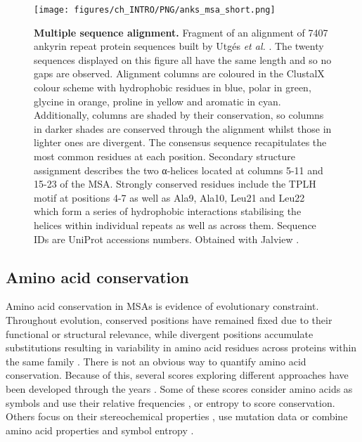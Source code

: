 \begin{figure}[htb!]
    \centering
    \texttt{[image: figures/ch\_INTRO/PNG/anks\_msa\_short.png]}
    \caption[Multiple sequence alignment]{\textbf{Multiple sequence alignment.} Fragment of an alignment of 7407 ankyrin repeat protein sequences built by Utgés \textit{et al.} \cite{UTGES_2021_ANKS}. The twenty sequences displayed on this figure all have the same length and so no gaps are observed. Alignment columns are coloured in the ClustalX colour scheme \cite{JEANMOUGIN_1998_CLUSTALX} with hydrophobic residues in blue, polar in green, glycine in orange, proline in yellow and aromatic in cyan. Additionally, columns are shaded by their conservation, so columns in darker shades are conserved through the alignment whilst those in lighter ones are divergent. The consensus sequence recapitulates the most common residues at each position. Secondary structure assignment describes the two α-helices located at columns 5-11 and 15-23 of the MSA. Strongly conserved residues include the TPLH motif at positions 4-7 as well as Ala9, Ala10, Leu21 and Leu22 which form a series of hydrophobic interactions stabilising the helices within individual repeats as well as across them. Sequence IDs are UniProt accessions numbers. Obtained with Jalview \cite{WATERHOUSE_2009_JALVIEW}.}
    \label{fig:MSA}
\end{figure}

\subsection{Amino acid conservation}

Amino acid conservation in MSAs is evidence of evolutionary constraint. Throughout evolution, conserved positions have remained fixed due to their functional or structural relevance, while divergent positions accumulate substitutions resulting in variability in amino acid residues across proteins within the same family \cite{ZUCKERKANDL_1965_DIVERGENCE}. There is not an obvious way to quantify amino acid conservation. Because of this, several scores exploring different approaches have been developed through the years \cite{VALDAR_2002_SCORES}. Some of these scores consider amino acids as symbols and use their relative frequencies \cite{WU_1970_SCORE, JORES_1990_SCORE, LOCKLESS_1999_SCORE}, or entropy \cite{SANDER_1991_SCORE, SHENKIN_1991_SCORE, GERSTEIN_1995_SCORE} to score conservation. Others focus on their stereochemical properties \cite{TAYLOR_1986_PROPERTIES, ZVELEBIL_1987_PREDICTION}, use mutation data \cite{KARLIN_1996_SCORE, THOMPSON_1997_SCORE, LANDGRAF_1999_SCORE, PILPEL_1999_SCORE, ARMON_2001_SCORE, VALDAR_2001_SCORE} or combine amino acid properties and symbol entropy \cite{WILLIAMSON_1995_SCORE, MIRNY_1999_SCORE}.

